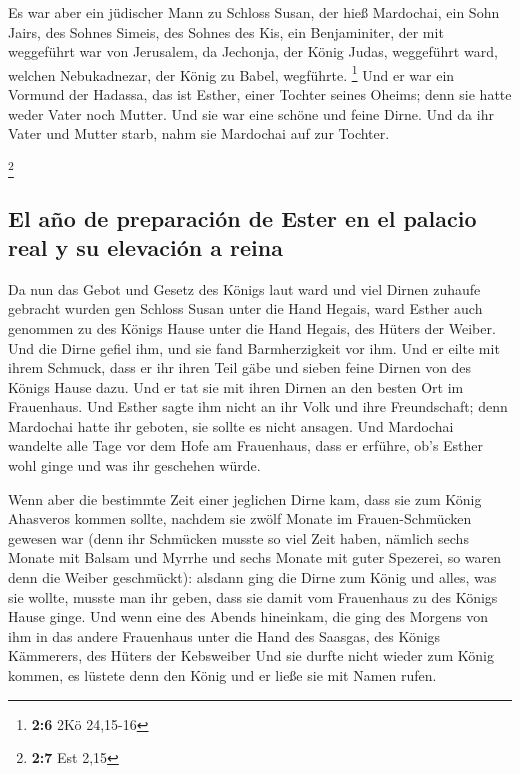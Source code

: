  Es war aber ein jüdischer Mann zu Schloss Susan, der hieß
Mardochai, ein Sohn Jairs, des Sohnes Simeis, des Sohnes des Kis, ein
Benjaminiter,  der mit weggeführt war von Jerusalem, da
Jechonja, der König Judas, weggeführt ward, welchen Nebukadnezar, der
König zu Babel, wegführte. \footnote{\textbf{2:6} 2Kö 24,15-16}
 Und er war ein Vormund der Hadassa, das ist Esther, einer
Tochter seines Oheims; denn sie hatte weder Vater noch Mutter. Und sie
war eine schöne und feine Dirne. Und da ihr Vater und Mutter starb, nahm
sie Mardochai auf zur Tochter.

\footnote{\textbf{2:7} Est 2,15}

\hypertarget{el-auxf1o-de-preparaciuxf3n-de-ester-en-el-palacio-real-y-su-elevaciuxf3n-a-reina}{%
\subsection{El año de preparación de Ester en el palacio real y su
elevación a
reina}\label{el-auxf1o-de-preparaciuxf3n-de-ester-en-el-palacio-real-y-su-elevaciuxf3n-a-reina}}

 Da nun das Gebot und Gesetz des Königs laut ward und viel
Dirnen zuhaufe gebracht wurden gen Schloss Susan unter die Hand Hegais,
ward Esther auch genommen zu des Königs Hause unter die Hand Hegais, des
Hüters der Weiber.  Und die Dirne gefiel ihm, und sie fand
Barmherzigkeit vor ihm. Und er eilte mit ihrem Schmuck, dass er ihr
ihren Teil gäbe und sieben feine Dirnen von des Königs Hause dazu. Und
er tat sie mit ihren Dirnen an den besten Ort im Frauenhaus.
 Und Esther sagte ihm nicht an ihr Volk und ihre
Freundschaft; denn Mardochai hatte ihr geboten, sie sollte es nicht
ansagen.  Und Mardochai wandelte alle Tage vor dem Hofe
am Frauenhaus, dass er erführe, ob's Esther wohl ginge und was ihr
geschehen würde.

 Wenn aber die bestimmte Zeit einer jeglichen Dirne kam,
dass sie zum König Ahasveros kommen sollte, nachdem sie zwölf Monate im
Frauen-Schmücken gewesen war (denn ihr Schmücken musste so viel Zeit
haben, nämlich sechs Monate mit Balsam und Myrrhe und sechs Monate mit
guter Spezerei, so waren denn die Weiber geschmückt): 
alsdann ging die Dirne zum König und alles, was sie wollte, musste man
ihr geben, dass sie damit vom Frauenhaus zu des Königs Hause ginge.
 Und wenn eine des Abends hineinkam, die ging des Morgens
von ihm in das andere Frauenhaus unter die Hand des Saasgas, des Königs
Kämmerers, des Hüters der Kebsweiber Und sie durfte nicht wieder zum
König kommen, es lüstete denn den König und er ließe sie mit Namen
rufen.

